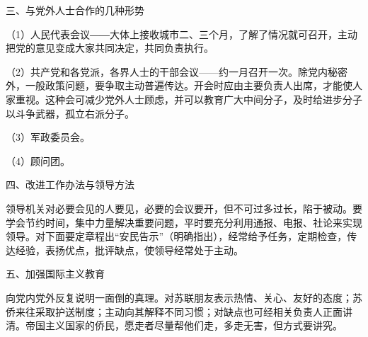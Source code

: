 三、与党外人士合作的几种形势

（1）人民代表会议――大体上接收城市二、三个月，了解了情况就可召开，主动把党的意见变成大家共同决定，共同负责执行。

（2）共产党和各党派，各界人士的干部会议——约一月召开一次。除党内秘密外，一般政策问题，要争取主动普遍传达。开会时应由主要负责人出席，才能使人家重视。这种会可减少党外人士顾虑，并可以教育广大中间分子，及时给进步分子以斗争武器，孤立右派分子。

（3）军政委员会。

（4）顾问团。

四、改进工作办法与领导方法

领导机关对必要会见的人要见，必要的会议要开，但不可过多过长，陷于被动。要学会节约时间，集中力量解决重要问题，平时要充分利用通报、电报、社论来实现领导。对下面要定章程出“安民告示”（明确指出），经常给予任务，定期检查，传达经验，表扬优点，批评缺点，使领导经常处于主动。

五、加强国际主义教育

向党内党外反复说明一面倒的真理。对苏联朋友表示热情、关心、友好的态度；苏侨来往采取护送制度；主动向其解释不同习惯；对缺点也可经相关负责人正面讲清。帝国主义国家的侨民，愿走者尽量帮他们走，多走无害，但方式要讲究。


